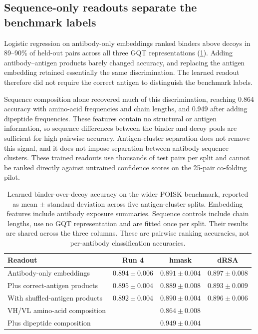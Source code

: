 \documentclass[11pt,a4paper]{article}
\begin{document}
\subsection{Sequence-only readouts separate the benchmark labels}
\label{sec:logreg-results}

Logistic regression on antibody-only embeddings ranked binders above decoys in 89--90\% of held-out pairs across all three GQT representations (\cref{tab:logreg}).
Adding antibody--antigen products barely changed accuracy, and replacing the antigen embedding retained essentially the same discrimination.
The learned readout therefore did not require the correct antigen to distinguish the benchmark labels.

Sequence composition alone recovered much of this discrimination, reaching 0.864 accuracy with amino-acid frequencies and chain lengths, and 0.949 after adding dipeptide frequencies.
These features contain no structural or antigen information, so sequence differences between the binder and decoy pools are sufficient for high pairwise accuracy.
Antigen-cluster separation does not remove this signal, and it does not impose separation between antibody sequence clusters.
These trained readouts use thousands of test pairs per split and cannot be ranked directly against untrained confidence scores on the 25-pair co-folding pilot.

\begin{table}[ht]
\centering
\caption{Learned binder-over-decoy accuracy on the wider POISK benchmark, reported as mean $\pm$ standard deviation across five antigen-cluster splits. Embedding features include antibody exposure summaries. Sequence controls include chain lengths, use no GQT representation and are fitted once per split. Their results are shared across the three columns. These are pairwise ranking accuracies, not per-antibody classification accuracies.}
\label{tab:logreg}
\small
\begin{tabularx}{\textwidth}{@{}Xccc@{}}
\toprule
Readout & Run 4 & hmask & dRSA \\
\midrule
Antibody-only embeddings & $0.894\pm0.006$ & $0.891\pm0.004$ & $0.897\pm0.008$ \\
Plus correct-antigen products & $0.895\pm0.004$ & $0.889\pm0.008$ & $0.893\pm0.009$ \\
With shuffled-antigen products & $0.892\pm0.004$ & $0.890\pm0.004$ & $0.896\pm0.006$ \\
\midrule
VH/VL amino-acid composition & \multicolumn{3}{c}{$0.864\pm0.008$} \\
Plus dipeptide composition & \multicolumn{3}{c}{$0.949\pm0.004$} \\
\bottomrule
\end{tabularx}
\end{table}
\end{document}
